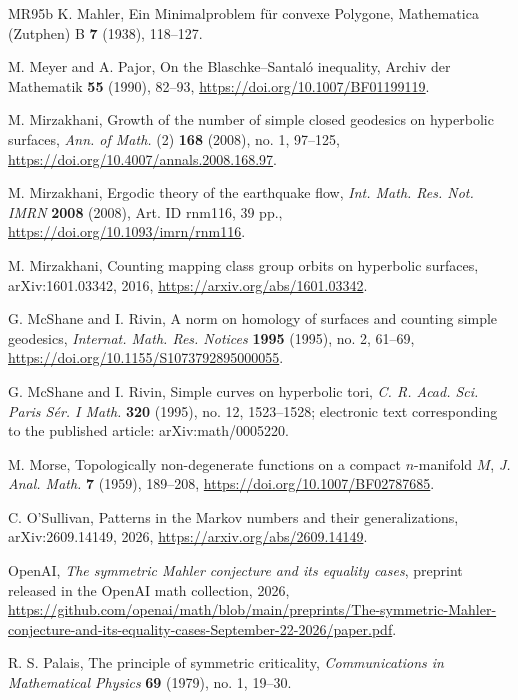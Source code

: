 \documentclass[10pt,twoside]{article}
\theoremstyle{plain}
\theoremstyle{definition}
\theoremstyle{remark}
\begin{document}
\begin{thebibliography}{MR95b}
K. Mahler,
Ein Minimalproblem f\"ur convexe Polygone,
Mathematica (Zutphen) B \textbf{7} (1938), 118--127.

M. Meyer and A. Pajor,
On the Blaschke--Santal\'o inequality,
Archiv der Mathematik \textbf{55} (1990), 82--93,
\url{https://doi.org/10.1007/BF01199119}.

M. Mirzakhani,
Growth of the number of simple closed geodesics on hyperbolic surfaces,
\emph{Ann. of Math.} (2) \textbf{168} (2008), no. 1, 97--125,
\url{https://doi.org/10.4007/annals.2008.168.97}.

M. Mirzakhani,
Ergodic theory of the earthquake flow,
\emph{Int. Math. Res. Not. IMRN} \textbf{2008} (2008),
Art. ID rnm116, 39 pp.,
\url{https://doi.org/10.1093/imrn/rnm116}.


M. Mirzakhani,
Counting mapping class group orbits on hyperbolic surfaces,
arXiv:1601.03342, 2016,
\url{https://arxiv.org/abs/1601.03342}.

G. McShane and I. Rivin,
A norm on homology of surfaces and counting simple geodesics,
\emph{Internat. Math. Res. Notices} \textbf{1995} (1995), no. 2, 61--69,
\url{https://doi.org/10.1155/S1073792895000055}.

G. McShane and I. Rivin,
Simple curves on hyperbolic tori,
\emph{C. R. Acad. Sci. Paris S\'er. I Math.} \textbf{320} (1995), no. 12,
1523--1528; electronic text corresponding to the published article:
arXiv:math/0005220.

M. Morse,
Topologically non-degenerate functions on a compact $n$-manifold $M$,
\emph{J. Anal. Math.} \textbf{7} (1959), 189--208,
\url{https://doi.org/10.1007/BF02787685}.

C. O'Sullivan,
Patterns in the Markov numbers and their generalizations,
arXiv:2609.14149, 2026,
\url{https://arxiv.org/abs/2609.14149}.

OpenAI,
\emph{The symmetric Mahler conjecture and its equality cases},
preprint released in the OpenAI math collection, 2026,
\url{https://github.com/openai/math/blob/main/preprints/The-symmetric-Mahler-conjecture-and-its-equality-cases-September-22-2026/paper.pdf}.

R. S. Palais,
The principle of symmetric criticality,
\emph{Communications in Mathematical Physics}
\textbf{69} (1979), no. 1, 19--30.


\end{thebibliography}
\end{document}

